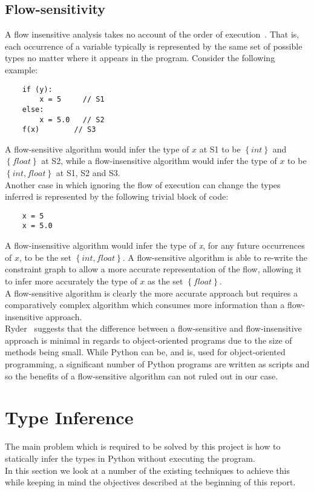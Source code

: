 \documentclass[12pt, titlepage]{article}
\begin{document}
\subsection{Flow-sensitivity}
A flow insensitive analysis takes no account of the order of execution~\cite{nielson99}. That is, each occurrence of a variable typically is represented by the same set of possible types no matter where it appears in the program. Consider the following example:
\begin{lstlisting}
	if (y):	
		x = 5     // S1
	else:
		x = 5.0   // S2
	f(x)		// S3
\end{lstlisting}
A flow-sensitive algorithm would infer the type of $x$ at S1 to be $\left\{ {int}\right\}$ and $\left\{ {float}\right\}$ at S2, while a flow-insensitive algorithm would infer the type of $x$ to be $\left\{ {int, float}\right\}$ at S1, S2 and S3. \\
Another case in which ignoring the flow of execution can change the types inferred is represented by the following trivial block of code:
\begin{lstlisting}
	x = 5
	x = 5.0
\end{lstlisting}
A flow-insensitive algorithm would infer the type of \textit{x}, for any future occurrences of $x$, to be the set $\left\{ {int, float}\right\}$. A flow-sensitive algorithm is able to re-write the constraint graph to allow a more accurate representation of the flow, allowing it to infer more accurately the type of $x$ as the set $\left\{ {float}\right\}$. \\
A flow-sensitive algorithm is clearly the more accurate approach but requires a comparatively complex algorithm which consumes more information than a flow-insensitive approach. \\
Ryder~\cite{ryder03} suggests that the difference between a flow-sensitive and flow-insensitive approach is minimal in regards to object-oriented programs due to the size of methods being small. While Python can be, and is, used for object-oriented programming, a significant number of Python programs are written as scripts and so the benefits of a flow-sensitive algorithm can not ruled out in our case.

\section{Type Inference}
The main problem which is required to be solved by this project is how to statically infer the types in Python without executing the program. \\
In this section we look at a number of the existing techniques to achieve this while keeping in mind the objectives described at the beginning of this report.
\end{document}
